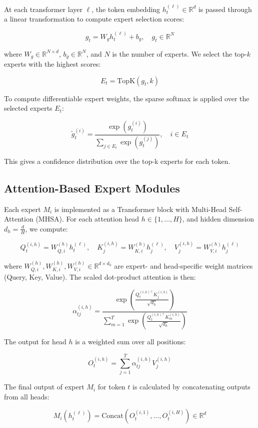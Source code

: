 \documentclass{article}
\begin{document}
At each transformer layer \( \ell \), the token embedding \( h_t^{(\ell)} \in \mathbb{R}^d \) is passed through a linear transformation to compute expert selection scores:

\[
g_t = W_g h_t^{(\ell)} + b_g, \quad g_t \in \mathbb{R}^N
\]


\noindent
where \( W_g \in \mathbb{R}^{N \times d} \), \( b_g \in \mathbb{R}^N \), and \( N \) is the number of experts. We select the top-\( k \) experts with the highest scores:

\[
E_t = \text{TopK}(g_t, k)
\]


\noindent
To compute differentiable expert weights, the sparse softmax is applied over the selected experts \( E_t \):

\[
\tilde{g}_t^{(i)} = \frac{\exp(g_t^{(i)})}{\sum_{j \in E_t} \exp(g_t^{(j)})}, \quad i \in E_t
\]


\noindent
This gives a confidence distribution over the top-k experts for each token.

\subsection{Attention-Based Expert Modules}

Each expert \( M_i \) is implemented as a Transformer block with Multi-Head Self-Attention (MHSA). For each attention head \( h \in \{1, \dots, H\} \), and hidden dimension \( d_h = \frac{d}{H} \), we compute:

\[
Q_t^{(i,h)} = W_{Q,i}^{(h)} h_t^{(\ell)}, \quad 
K_j^{(i,h)} = W_{K,i}^{(h)} h_j^{(\ell)}, \quad 
V_j^{(i,h)} = W_{V,i}^{(h)} h_j^{(\ell)}
\]


\noindent
where \( W_{Q,i}^{(h)}, W_{K,i}^{(h)}, W_{V,i}^{(h)} \in \mathbb{R}^{d \times d_h} \) are expert- and head-specific weight matrices (Query, Key, Value). The scaled dot-product attention is then:

\[
\alpha_{tj}^{(i,h)} = \frac{\exp \left( \frac{Q_t^{(i,h)\top} K_j^{(i,h)}}{\sqrt{d_h}} \right)}{\sum_{m=1}^{T} \exp \left( \frac{Q_t^{(i,h)\top} K_m^{(i,h)}}{\sqrt{d_h}} \right)}
\]


\noindent
The output for head \( h \) is a weighted sum over all positions:

\[
O_t^{(i,h)} = \sum_{j=1}^{T} \alpha_{tj}^{(i,h)} V_j^{(i,h)}
\]


\noindent
The final output of expert \( M_i \) for token \( t \) is calculated by concatenating outputs from all heads:

\[
M_i(h_t^{(\ell)}) = \text{Concat}(O_t^{(i,1)}, \dots, O_t^{(i,H)}) \in \mathbb{R}^d
\]
\end{document}
